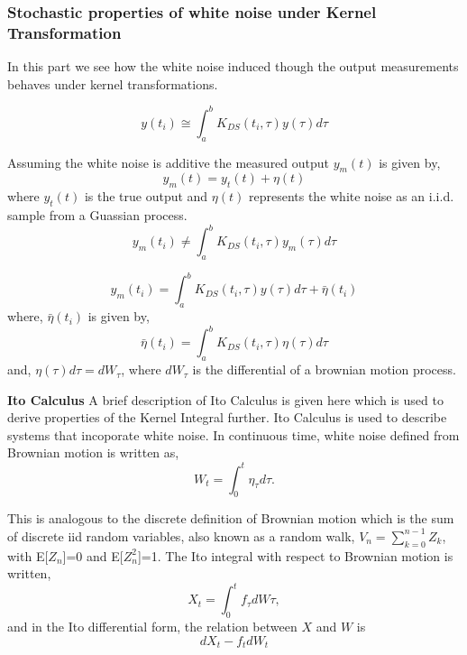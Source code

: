 \documentclass{article}
\begin{document}
\subsubsection{Stochastic properties of white noise under Kernel Transformation}
In this part we see how the white noise induced though the output measurements behaves under kernel transformations.

\begin{equation}
	y(t_i) \cong \int_a^b K_{DS}(t_i,\tau) y(\tau)d\tau
\end{equation}

Assuming the white noise is additive the measured output $y_m(t)$ is given by, 
\begin{equation}
	y_m(t) = y_t(t) + \eta(t)
\end{equation}
where $y_t(t)$ is the true output and $\eta(t)$ represents the white noise as an i.i.d. sample from a Guassian process. 
\begin{equation}
	y_m(t_i) \neq \int_a^b K_{DS}(t_i,\tau) y_m(\tau)d\tau
\end{equation}

\begin{equation}
	y_m(t_i) = \int_a^b K_{DS}(t_i,\tau) y(\tau)d\tau + \bar{\eta}(t_i)
\end{equation}
where, $\bar{\eta}(t_i)$ is given by, 
\begin{equation}
	\label{eq:kernel_noise}
	\bar{\eta}(t_i) = \int_a^b K_{DS}(t_i,\tau) \eta(\tau)d\tau
\end{equation} 
and, $\eta(\tau)d\tau = dW_\tau$, where $dW_\tau$ is the differential of a brownian motion process. 

\textbf{Ito Calculus}
A brief description of Ito Calculus is given here which is used to derive properties of the Kernel Integral further. Ito Calculus is used to describe systems that incoporate white noise. In continuous time, white noise defined from Brownian motion is written as, 
\begin{equation}
W_t = \int_0^t \eta_\tau d\tau .
\end{equation}

This is analogous to the discrete definition of Brownian motion which is the sum of discrete iid random variables, also known as a random walk, $V_n = \sum_{k=0}^{n-1} Z_k$, with E[$Z_n$]=0 and E[$Z_n^2$]=1. The Ito integral with respect to Brownian motion is written, 
\begin{equation}
X_t = \int_0^t f_\tau dW\tau,
\end{equation} 
and in the Ito differential form, the relation between $X$ and $W$ is 
\begin{equation}
dX_t - f_tdW_t
\end{equation}
\end{document}

